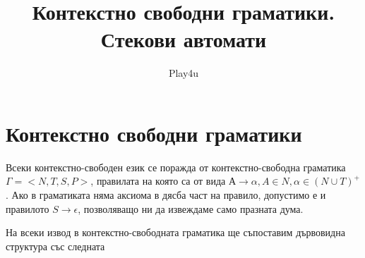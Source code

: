 \documentclass[11pt]{article} %
\title{Контекстно свободни граматики. Стекови автомати}
\author{Play4u}
\begin{document}
\maketitle

\newcommand{\lrangle}[1]{\left\langle #1 \right\rangle}

\newcommand{\belongsTo}{\in}
\newcommand{\notBelongsTo}{\centernot\in}

\newcommand{\kda}{A = <Q, X, q_{0}, \delta, F>}
\newcommand{\cfg}{\Gamma = <N, T, S, P>}

\newcommand{\italicBold}[1]{\textbf{\emph{#1}}}
\newcommand{\definition}{\italicBold{Дефиниция:}}
\newcommand{\theorem}{\italicBold{Теорема:}}
\newcommand{\lemma}{\italicBold{Лема:}}
\newcommand{\proof}{\italicBold{Доказателство:}}

\newcommand{\curlies}[1]{\{#1\}}

\newcommand{\enumNum}{\renewcommand{\theenumi}{\arabic{enumi}}}
\newcommand{\enumlet}{\renewcommand{\theenumi}{\alph{enumi}}}

\section{Контекстно свободни граматики}
Всеки контекстно-свободен език се поражда от контекстно-свободна граматика $\cfg$, правилата на която са от вида $А \to \alpha, A \in N, \alpha \in (N \cup T)^{+}$.
Ако в граматиката няма аксиома в дясба част на правило, допустимо е и правилото $S \to \epsilon$, позволяващо ни да извеждаме само празната дума. \par

На всеки извод в контекстно-свободната граматика ще  съпоставим дървовидна структура със следната 
\end{document}
